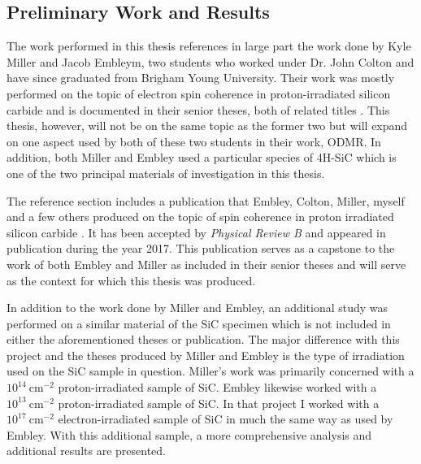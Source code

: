\documentclass[oneside, noacknowlegments]{BYUPhys}
\begin{document}
\subsection{Preliminary Work and Results}

The work performed in this thesis references in large part the work done by Kyle Miller and Jacob Embleym, two students who worked under Dr. John Colton and have since graduated from Brigham Young University. Their work was mostly performed on the topic of electron spin coherence in proton-irradiated silicon carbide and is documented in their senior theses, both of related titles \cite{RefWorks:doc:5892989ee4b0499fa95c51c8} \cite{RefWorks:doc:5892912ae4b0dec22aee3993}. This thesis, however, will not be on the same topic as the former two but will expand on one aspect used by both of these two students in their work, ODMR. In addition, both Miller and Embley used a particular species of 4H-SiC which is one of the two principal materials of investigation in this thesis.

The reference section includes a publication that Embley, Colton, Miller, myself and a few others produced on the topic of spin coherence in proton irradiated silicon carbide \cite{RefWorks:doc:58929128e4b0499fa95c5064}. It has been accepted by \textit{Physical Review B} and appeared in publication during the year 2017. This publication serves as a capstone to the work of both Embley and Miller as included in their senior theses and will serve as the context for which this thesis was produced.

In addition to the work done by Miller and Embley, an additional study was performed on a similar material of the SiC specimen which is not included in either the aforementioned theses or publication. The major difference with this project and the theses produced by Miller and Embley is the type of irradiation used on the SiC sample in question. Miller's work was primarily concerned with a $10^{14}~\text{cm}^{-2}$ proton-irradiated sample of SiC. Embley likewise worked with a $10^{13}~\text{cm}^{-2}$ proton-irradiated sample of SiC. In that project I worked with a $10^{17}~\text{cm}^{-2}$ electron-irradiated sample of SiC in much the same way as used by Embley. With this additional sample, a more comprehensive analysis and additional results are presented.
\end{document}
